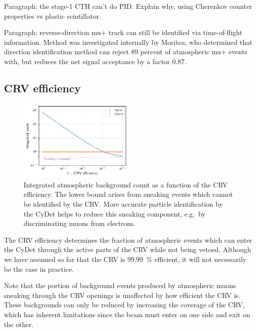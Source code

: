 Paragraph: the stage-1 CTH can't do PID. Explain why, using Cherenkov counter
properties vs plastic scintillator.

Paragraph: reverse-direction mu+ track can still be identified via
time-of-flight information. Method was investigated internally by Moritsu, who
determined that direction identification method can reject 89 percent of
atmospheric mu+ events with, but reduces the net signal acceptance by a
factor 0.87.



\subsection{CRV efficiency}

\begin{figure}
    \centering
    \includegraphics[width=0.5\textwidth]{chapter6/bg_count_vs_crv_efficiency.pdf}
    \caption{ Integrated atmospheric background count as a function of the CRV
        efficiency. The lower bound arises from sneaking events which cannot be
        identified by the CRV. More accurate particle identification by the
        CyDet helps to reduce this sneaking component, e.g.\ by discriminating
        muons from electrons.}
    \label{fig:bg_count_vs_crv_efficiency}
\end{figure}

The CRV efficiency determines the fraction of atmospheric events which
can enter the CyDet through the active parts of the CRV while not being vetoed.
Although we have assumed so far that the CRV is \SI{99.99}{\percent}
efficient, it will not necessarily be the case in practice.

Note that the portion of background events produced by atmospheric muons
sneaking through the CRV openings is unaffected by how efficient the CRV is.
These backgrounds can only be reduced by increasing the coverage of the CRV,
which has inherent limitations since the beam must enter on one side and exit
on the other.
